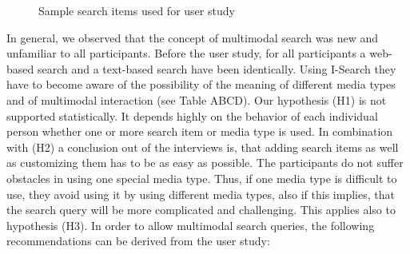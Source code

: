 \documentclass[runningheads,a4paper]{llncs} \usepackage[utf8]{inputenc}
\begin{document}
\begin{figure}[h!]
\hfill 
{}\hfill 
{}
\caption{Sample search items used for user study}
\end{figure}

In general, we observed that the concept of multimodal search was new and
unfamiliar to all participants. Before the user study, for all participants a
web-based search and a text-based search have been identically. Using I-Search
they have to become aware of the possibility of the meaning of different media
types and of multimodal interaction (see Table ABCD). Our hypothesis (H1) is not
supported statistically. It depends highly on the behavior of each individual
person whether one or more search item or media type is used. In combination
with (H2) a conclusion out of the interviews is, that adding search items as
well as customizing them has to be as easy as possible. The participants do not
suffer obstacles in using one special media type. Thus, if one media type is
difficult to use, they avoid using it by using different media types, also if
this implies, that the search query will be more complicated and challenging.
This applies also to hypothesis (H3). In order to allow multimodal search
queries, the following recommendations can be derived from the user study: 
\end{document}
